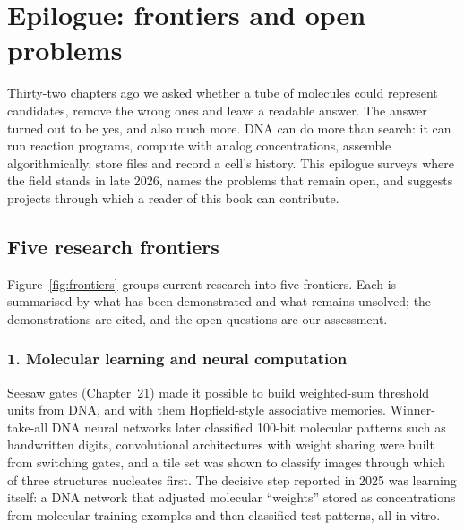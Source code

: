 \chapter*{Epilogue: frontiers and open problems}
\label{ch:epilogue}

Thirty-two chapters ago we asked whether a tube of molecules could represent
candidates, remove the wrong ones and leave a readable answer. The answer turned
out to be yes, and also much more. DNA can do more than search: it can run
reaction programs, compute with analog concentrations, assemble algorithmically,
store files and record a cell's history. This epilogue surveys where the field
stands in late 2026, names the problems that remain open, and suggests projects
through which a reader of this book can contribute.

\section*{Five research frontiers}
Figure~\ref{fig:frontiers} groups current research into five frontiers. Each is
summarised by what has been demonstrated and what remains unsolved; the
demonstrations are cited, and the open questions are our assessment.


\subsection*{1. Molecular learning and neural computation}
Seesaw gates (Chapter~21) made it possible to build weighted-sum threshold
units from DNA, and with them Hopfield-style associative memories.\cite{QianWinfreeBruck2011}
Winner-take-all DNA neural networks later classified 100-bit molecular patterns
such as handwritten digits,\cite{CherryQian2018} convolutional architectures with
weight sharing were built from switching gates,\cite{Xiong2022} and a tile set
was shown to classify images through which of three structures nucleates
first.\cite{Evans2024} The decisive step reported in 2025 was learning itself:
a DNA network that adjusted molecular ``weights'' stored as concentrations from
molecular training examples and then classified test patterns, all in vitro.\cite{CherryQian2025}

